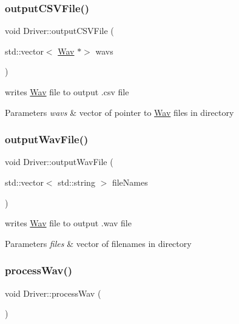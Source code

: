 \subsubsection{\texorpdfstring{output\+C\+S\+V\+File()}{outputCSVFile()}}
{\footnotesize\ttfamily void Driver\+::output\+C\+S\+V\+File (\begin{DoxyParamCaption}\item[{std\+::vector$<$ \hyperlink{classWav}{Wav} $\ast$$>$}]{wavs }\end{DoxyParamCaption})}

writes \hyperlink{classWav}{Wav} file to output .csv file 
\begin{DoxyParams}{Parameters}
{\em wavs} & vector of pointer to \hyperlink{classWav}{Wav} files in directory \\
\hline
\end{DoxyParams}
\mbox{\label{classDriver_a43544d196cd4055dced0c0ef654ffd62}} 
\subsubsection{\texorpdfstring{output\+Wav\+File()}{outputWavFile()}}
{\footnotesize\ttfamily void Driver\+::output\+Wav\+File (\begin{DoxyParamCaption}\item[{std\+::vector$<$ std\+::string $>$}]{file\+Names }\end{DoxyParamCaption})}

writes \hyperlink{classWav}{Wav} file to output .wav file 
\begin{DoxyParams}{Parameters}
{\em files} & vector of filenames in directory \\
\hline
\end{DoxyParams}
\mbox{\label{classDriver_a7b8110d43dc29e26fec11f4120693714}} 
\subsubsection{\texorpdfstring{process\+Wav()}{processWav()}}
{\footnotesize\ttfamily void Driver\+::process\+Wav (\begin{DoxyParamCaption}{ }\end{DoxyParamCaption})}

